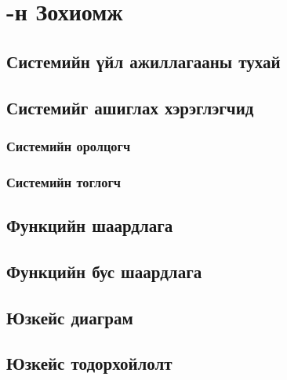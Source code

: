 
\section{\ttitle-н Зохиомж} %


	\subsection{Системийн үйл ажиллагааны тухай}

	\subsection{Системийг ашиглах хэрэглэгчид}
		\subsubsection{Системийн оролцогч}
    	\subsubsection{Системийн тоглогч}
  
	\subsection{Функцийн шаардлага}

	\subsection{Функцийн бус шаардлага}

	\subsection{Юзкейс диаграм}

	\subsection{Юзкейс тодорхойлолт}

